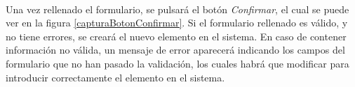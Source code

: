   \paragraph{}Una vez rellenado el formulario, se pulsará el botón
  \textit{Confirmar}, el cual se puede ver en la figura
  \ref{capturaBotonConfirmar}. Si el formulario rellenado es válido, y no tiene
  errores, se creará el nuevo elemento en el sistema. En caso de contener
  información no válida, un mensaje de error aparecerá indicando los campos
  del formulario que no han pasado la validación, los cuales habrá que modificar
  para introducir correctamente el elemento en el sistema.
